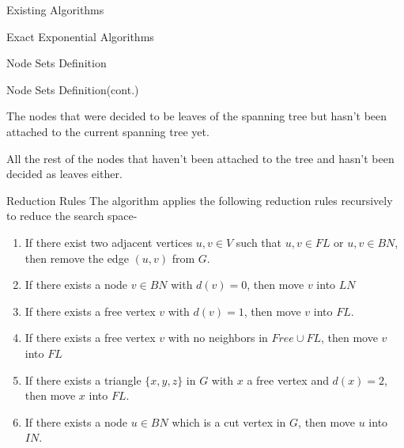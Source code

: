 \documentclass[xcolor=svgnames]{beamer}
\begin{document}
\begin{section}{Existing Algorithms}
\begin{subsection}{Exact Exponential Algorithms}
\begin{frame}{Node Sets Definition}
{            }
        \end{frame}
        \begin{frame}{Node Sets Definition(cont.)}
            \begin{description}[<+->]
                \item[Floating Leaves(FL):] The nodes that were decided to be leaves of the spanning tree but hasn't been attached to the current spanning tree yet.
                \item[Free Nodes(FN):] All the rest of the nodes that haven't been attached to the tree and hasn't been decided as leaves either. 
            \end{description}
            \centering
        \end{frame}
        \begin{frame}{Reduction Rules}
            The algorithm applies the following reduction rules recursively to reduce the search space-
            \begin{enumerate}[<+->]
                \item If there exist two adjacent vertices $u, v \in V$ such that $u, v \in FL$ or $u, v \in BN$, then remove the edge $(u, v)$ from $G$.
                \item  If there exists a node $v \in BN$ with $d(v) = 0$, then move $v$ into $LN$
                \item If there exists a free vertex $v$ with $d(v) = 1$, then move $v$ into $FL$.
                \item  If there exists a free vertex $v$ with no neighbors in $Free \cup FL$, then move $v$ into $FL$
                \item If there exists a triangle $\{x, y, z\}$ in $G$ with $x$ a free vertex and $d(x) = 2$, then move $x$ into $FL$.
                \item If there exists a node $u \in BN$ which is a cut vertex in $G$, then move $u$ into $IN$.

\end{enumerate}
\end{frame}
\end{subsection}
\end{section}
\end{document}
